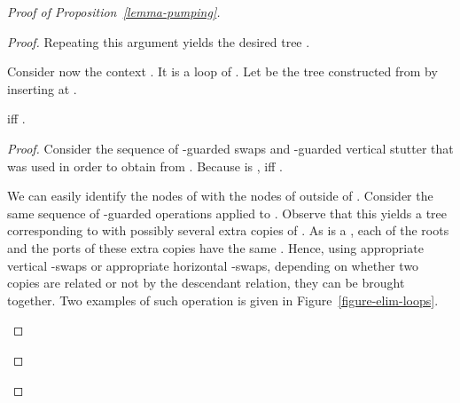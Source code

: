 \begin{proof}[Proof of Proposition~\ref{lemma-pumping}]
\begin{proof}
 Repeating this argument yields the desired
  tree .
 
Consider now the context . It is a loop of \ktype . Let
 be the tree constructed from  by inserting  at . 

\begin{claim} \label{claim-reverse-swaps}
 iff .
\end{claim}

\begin{proof}
  Consider the sequence of -guarded swaps and -guarded vertical stutter
  that was used in order to obtain  from . Because  is \ktame,  iff .

  We can easily identify the nodes of  with the nodes of  outside of
  . Consider the same sequence of -guarded operations applied to .
  Observe that this yields a tree  corresponding to  with possibly several
  extra copies of . As  is a \kloop, each of the roots and the ports of these
  extra copies have the same \ktype. Hence, using appropriate vertical -swaps or
  appropriate horizontal -swaps, depending on whether two copies are related or
  not by the descendant relation, they can be brought together. Two examples of
  such operation is given in Figure~\ref{figure-elim-loops}.





\begin{figure}
\begin{center}
\end{center}
\end{figure}
\end{proof}
\end{proof}
\end{proof}
